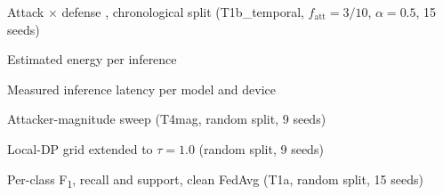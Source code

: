 \documentclass[review,12pt]{elsarticle}
\begin{document}
\begin{table}[tbp]
\centering
\caption{Attack $\times$ defense \macroF{}, chronological split (T1b\_temporal, $f_{\mathrm{att}}=3/10$, $\alpha=0.5$, 15 seeds)}
\label{tab:temporal_attack}

\end{table}

\begin{table}[tbp]
\centering
\caption{Estimated energy per inference}
\label{tab:energy}

\end{table}

\begin{table}[tbp]
\centering
\caption{Measured inference latency per model and device}
\label{tab:latency}

\end{table}

\begin{table}[tbp]
\centering
\caption{Attacker-magnitude sweep (T4mag, random split, 9 seeds)}
\label{tab:magnitude}

\end{table}

\begin{table}[tbp]
\centering
\caption{Local-DP grid extended to $\tau=1.0$ (random split, 9 seeds)}
\label{tab:ldp_tau_extended}

\end{table}

\begin{table}[tbp]
\centering
\caption{Per-class F\textsubscript{1}, recall and support, clean FedAvg (T1a, random split, 15 seeds)}
\label{tab:perclass}

\end{table}



\end{document}
